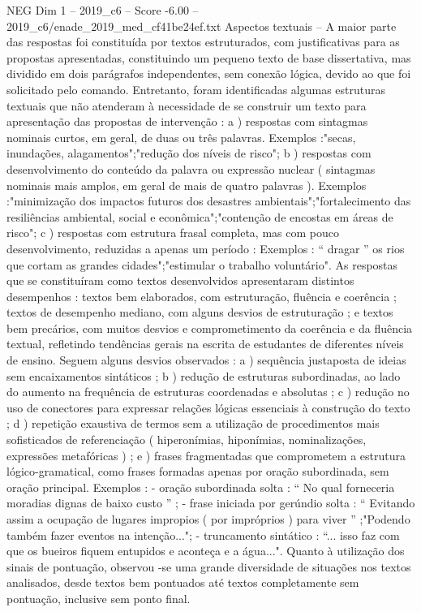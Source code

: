 \begin{textsample}{NEG Dim 1 – 2019\_c6 – Score -6.00 – 2019\_c6/enade\_2019\_med\_cf41be24ef.txt}
Aspectos textuais – A maior parte das respostas foi constituída por textos estruturados, com justificativas para as propostas apresentadas, constituindo um pequeno texto de base dissertativa, mas dividido em dois parágrafos independentes, sem conexão lógica, devido ao que foi solicitado pelo comando.
Entretanto, foram identificadas algumas estruturas textuais que não atenderam à necessidade de se construir um texto para apresentação das propostas de intervenção : a ) respostas com sintagmas nominais curtos, em geral, de duas ou três palavras.
Exemplos :"secas, inundações, alagamentos";"redução dos níveis de risco"; b ) respostas com desenvolvimento do conteúdo da palavra ou expressão nuclear ( sintagmas nominais mais amplos, em geral de mais de quatro palavras ).
Exemplos :"minimização dos impactos futuros dos desastres ambientais";"fortalecimento das resiliências ambiental, social e econômica";"contenção de encostas em áreas de risco"; c ) respostas com estrutura frasal completa, mas com pouco desenvolvimento, reduzidas a apenas um período : Exemplos : “ dragar ” os rios que cortam as grandes cidades";"estimular o trabalho voluntário".
As respostas que se constituíram como textos desenvolvidos apresentaram distintos desempenhos : textos bem elaborados, com estruturação, fluência e coerência ; textos de desempenho mediano, com alguns desvios de estruturação ; e textos bem precários, com muitos desvios e comprometimento da coerência e da fluência textual, refletindo tendências gerais na escrita de estudantes de diferentes níveis de ensino.
Seguem alguns desvios observados : a ) sequência justaposta de ideias sem encaixamentos sintáticos ; b ) redução de estruturas subordinadas, ao lado do aumento na frequência de estruturas coordenadas e absolutas ; c ) redução no uso de conectores para expressar relações lógicas essenciais à construção do texto ; d ) repetição exaustiva de termos sem a utilização de procedimentos mais sofisticados de referenciação ( hiperonímias, hiponímias, nominalizações, expressões metafóricas ) ; e ) frases fragmentadas que comprometem a estrutura lógico-gramatical, como frases formadas apenas por oração subordinada, sem oração principal.
Exemplos : - oração subordinada solta : “ No qual forneceria moradias dignas de baixo custo ” ; - frase iniciada por gerúndio solta : “ Evitando assim a ocupação de lugares impropios ( por impróprios ) para viver ” ;"Podendo também fazer eventos na intenção..."; - truncamento sintático : “... isso faz com que os bueiros fiquem entupidos e aconteça e a água...".
Quanto à utilização dos sinais de pontuação, observou -se uma grande diversidade de situações nos textos analisados, desde textos bem pontuados até textos completamente sem pontuação, inclusive sem ponto final.

\end{textsample}

